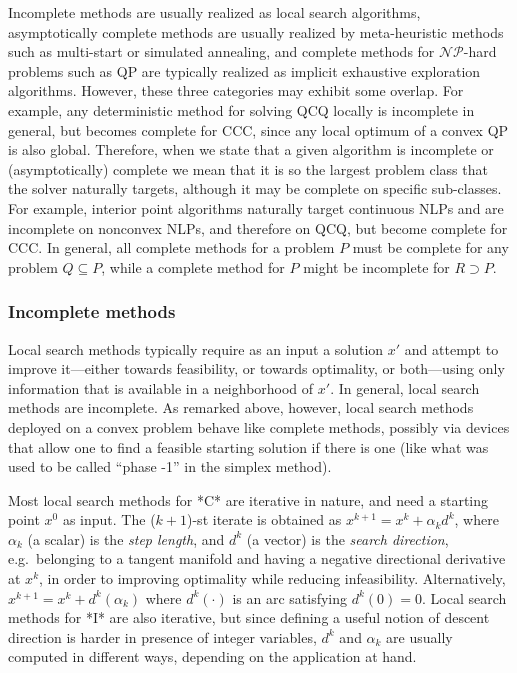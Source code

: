 Incomplete methods are usually realized as local search algorithms, asymptotically complete methods are usually realized by meta-heuristic methods such as multi-start or simulated annealing, and complete methods for $\mathcal{NP}$-hard problems such as QP are typically realized as implicit exhaustive exploration algorithms. However, these three categories may exhibit some overlap. For example, any deterministic method for solving QCQ locally is incomplete in general, but becomes complete for CCC, since any local optimum of a convex QP is also global. Therefore, when we state that a given algorithm is incomplete or (asymptotically) complete we mean that it is so the largest problem class that the solver naturally targets, although it may be complete on specific sub-classes. For example, interior point algorithms naturally target continuous NLPs and are incomplete on nonconvex NLPs, and therefore on QCQ, but become complete for CCC. In general, all complete methods for a problem $P$ must be complete for any problem $Q \subseteq P$, while a complete method for $P$ might be incomplete for $R \supset P$.



\subsubsection{Incomplete methods}\label{s:incomplete}

Local search methods typically require as an input a solution $x'$ and attempt to improve it---either towards feasibility, or towards optimality, or both---using only information that is available in a neighborhood of $x'$. In general, local search methods are incomplete. As remarked above, however, local search methods deployed on a convex problem behave like complete methods, possibly via devices that allow one to find a feasible starting solution if there is one (like what was used to be called ``phase -1'' in the simplex method).

Most local search methods for *C* are iterative in nature, and need a starting point $x^0$ as input. The ($k+1$)-st iterate is obtained as $x^{k+1} = x^k + \alpha_k d^k$, where $\alpha_k$ (a scalar) is the \emph{step length}, and $d^k$ (a vector) is the \emph{search direction}, e.g.~belonging to a tangent manifold and having a negative directional derivative at $x^k$, in order to improving optimality while reducing infeasibility. Alternatively, $x^{k+1} = x^k + d^k(\alpha_k)$ where $d^k(\cdot)$ is an arc satisfying $d^k(0) = 0$. Local search methods for *I* are also iterative, but since defining a useful notion of descent direction is harder in presence of integer variables, $d^k$ and $\alpha_k$ are usually computed in different ways, depending on the application at hand. 

